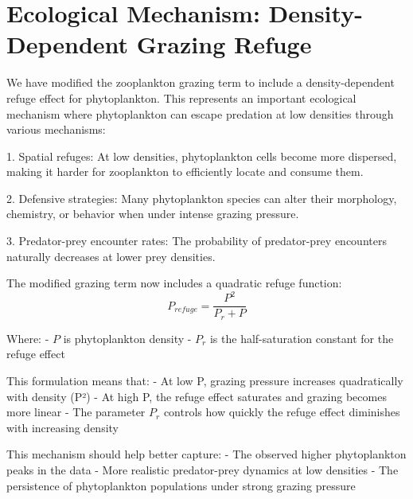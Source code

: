 \section{Ecological Mechanism: Density-Dependent Grazing Refuge}

We have modified the zooplankton grazing term to include a density-dependent refuge effect for phytoplankton. This represents an important ecological mechanism where phytoplankton can escape predation at low densities through various mechanisms:

1. Spatial refuges: At low densities, phytoplankton cells become more dispersed, making it harder for zooplankton to efficiently locate and consume them.

2. Defensive strategies: Many phytoplankton species can alter their morphology, chemistry, or behavior when under intense grazing pressure.

3. Predator-prey encounter rates: The probability of predator-prey encounters naturally decreases at lower prey densities.

The modified grazing term now includes a quadratic refuge function:
\[ P_{refuge} = \frac{P^2}{P_r + P} \]

Where:
- $P$ is phytoplankton density
- $P_r$ is the half-saturation constant for the refuge effect

This formulation means that:
- At low P, grazing pressure increases quadratically with density (P²)
- At high P, the refuge effect saturates and grazing becomes more linear
- The parameter $P_r$ controls how quickly the refuge effect diminishes with increasing density

This mechanism should help better capture:
- The observed higher phytoplankton peaks in the data
- More realistic predator-prey dynamics at low densities
- The persistence of phytoplankton populations under strong grazing pressure
